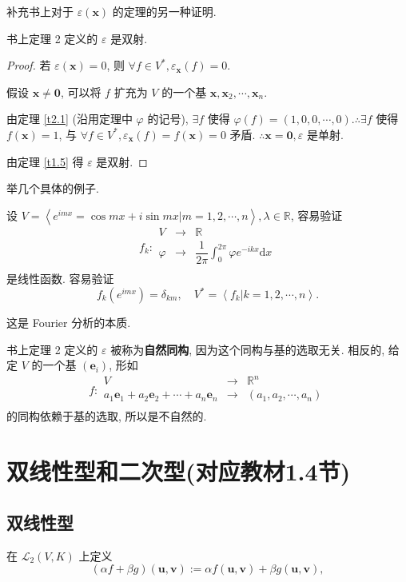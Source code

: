 \documentclass[color=black,device=normal,lang=cn,mode=geye]{elegantnote}
\begin{document}
补充书上对于 $\varepsilon(\boldsymbol{x})$ 的定理的另一种证明.
\begin{theorem}
    书上定理 2 定义的 $\varepsilon$ 是双射.
\end{theorem}
\begin{proof}
    若 $\varepsilon(\boldsymbol{x})=0$, 则 $\forall f\in V^*,\varepsilon_{\boldsymbol{x}}(f)=0$.

    假设 $\boldsymbol{x}\neq\boldsymbol{0}$, 可以将 $f$ 扩充为 $V$ 的一个基 $\boldsymbol{x},\boldsymbol{x}_2,\cdots,\boldsymbol{x}_n$.
    
    由定理 \ref{t2.1} (沿用定理中 $\varphi$ 的记号), $\exists f$ 使得 $\varphi(f)=(1,0,0,\cdots,0).\therefore\exists f$ 使得 $f(\boldsymbol{x})=1$, 与 $\forall f\in V^*,\varepsilon_{\boldsymbol{x}}(f)=f(\boldsymbol{x})=0$ 矛盾. $\therefore\boldsymbol{x}=\boldsymbol{0},\varepsilon$ 是单射.

    由定理 \ref{t1.5} 得 $\varepsilon$ 是双射.
\end{proof}
举几个具体的例子.
\begin{example}
    设 $V=\left<e^{imx}=\cos mx+i\sin mx|m=1,2,\cdots,n\right>,\lambda\in\mathbb{R}$, 
    容易验证
    \[f_k:\begin{array}{rcl}
        V & \to & \mathbb{R} \\
        \varphi & \to & \dfrac{1}{2\pi}\int_0^{2\pi}\varphi e^{-ikx}\mathrm{d}x \\
    \end{array}\]
    是线性函数. 容易验证
    \[f_k(e^{imx})=\delta_{km},\quad V^*=\left<f_k|k=1,2,\cdots,n\right>.\]

    这是 Fourier 分析的本质.
\end{example}
书上定理 2 定义的 $\varepsilon$ 被称为\textbf{自然同构}, 因为这个同构与基的选取无关. 相反的, 给定 $V$ 的一个基 $(\boldsymbol{e}_i)$, 形如
\[f:\begin{array}{rcl}
    V & \to & \mathbb{R}^n \\
    a_1\boldsymbol{e}_1+a_2\boldsymbol{e}_2+\cdots+a_n\boldsymbol{e}_n & \to & (a_1,a_2,\cdots,a_n) \\
\end{array}\]
的同构依赖于基的选取, 所以是不自然的.
\section{双线性型和二次型(对应教材1.4节)}
\subsection{双线性型}
在 $\mathcal{L}_2(V,K)$ 上定义
\[(\alpha f+\beta g)(\boldsymbol{u},\boldsymbol{v}):=\alpha f(\boldsymbol{u},\boldsymbol{v})+\beta g(\boldsymbol{u},\boldsymbol{v}),\]
\end{document}
